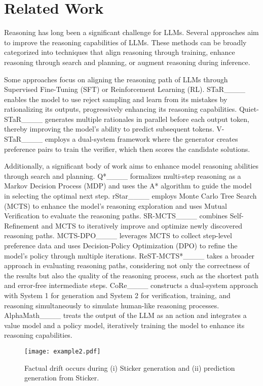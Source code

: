 \section{Related Work}
\label{sec:related}

Reasoning has long been a significant challenge for LLMs. 
Several approaches aim to improve the reasoning capabilities of LLMs. 
These methods can be broadly categorized into techniques that align reasoning through training, enhance reasoning through search and planning, or augment reasoning during inference.

Some approaches focus on aligning the reasoning path of LLMs through Supervised Fine-Tuning (SFT) or Reinforcement Learning (RL).
STaR____ enables the model to use reject sampling and learn from its mistakes by rationalizing its outputs, progressively enhancing its reasoning capabilities. 
Quiet-STaR____ generates multiple rationales in parallel before each output token, thereby improving the model's ability to predict subsequent tokens.
V-STaR____ employs a dual-system framework where the generator creates preference pairs to train the verifier, which then scores the candidate solutions.

Additionally, a significant body of work aims to enhance model reasoning abilities through search and planning. 
Q*____ formalizes multi-step reasoning as a Markov Decision Process (MDP) and uses the A* algorithm to guide the model in selecting the optimal next step. 
rStar____ employs Monte Carlo Tree Search (MCTS) to enhance the model's reasoning exploration and uses Mutual Verification to evaluate the reasoning paths. 
SR-MCTS____ combines Self-Refinement and MCTS to iteratively improve and optimize newly discovered reasoning paths. 
MCTS-DPO____ leverages MCTS to collect step-level preference data and uses Decision-Policy Optimization (DPO) to refine the model’s policy through multiple iterations. 
ReST-MCTS*____ takes a broader approach in evaluating reasoning paths, considering not only the correctness of the results but also the quality of the reasoning process, such as the shortest path and error-free intermediate steps. 
CoRe____ constructs a dual-system approach with System 1 for generation and System 2 for verification, training, and reasoning simultaneously to simulate human-like reasoning processes. 
AlphaMath____ treats the output of the LLM as an action and integrates a value model and a policy model, iteratively training the model to enhance its reasoning capabilities.

\begin{figure}[t]
    \centering
    \texttt{[image: example2.pdf]}
    \caption{Factual drift occurs during (i) Sticker generation and (ii) prediction generation from Sticker.}
    \label{fig:example2}
\end{figure}

